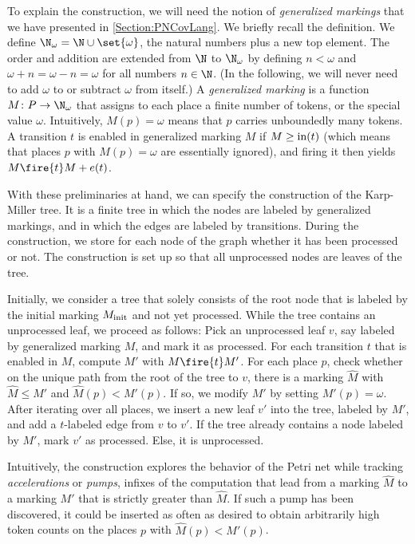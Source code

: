\documentclass[../../diss.tex]{subfiles}
\begin{document}
To explain the construction, we will need the notion of \emph{generalized markings} that we have presented in \cref{Section:PNCovLang}.
We briefly recall the definition.
We define $\N_\omega = \N \cup \set{\omega}$, the natural numbers plus a new top element.
The order and addition are extended from $\N$ to $\N_\omega$ by defining $n < \omega$ and $\omega + n = \omega - n = \omega$ for all numbers $n \in \N$.
(In the following, we will never need to add $\omega$ to or subtract $\omega$ from itself.)
A \emph{generalized marking} is a function $M \colon P \to \N_\omega$ that assigns to each place a finite number of tokens, or the special value $\omega$.
Intuitively, $M(p) = \omega$ means that $p$ carries unboundedly many tokens.
A transition $t$ is enabled in generalized marking $M$ if $M \geq \text{in}(t)$ (which means that places $p$ with $M(p) = \omega$ are essentially ignored), and firing it then yields $M \fire{t} M + e(t)$.

With these preliminaries at hand, we can specify the construction of the Karp-Miller tree.
It is a finite tree in which the nodes are labeled by generalized markings, and in which the edges are labeled by transitions.
During the construction, we store for each node of the graph whether it has been processed or not.
The construction is set up so that all unprocessed nodes are leaves of the tree.

Initially, we consider a tree that solely consists of the root node that is labeled by the initial marking $M_{\text{init}}$ and not yet processed.
While the tree contains an unprocessed leaf, we proceed as follows:
Pick an unprocessed leaf $v$, say labeled by generalized marking $M$, and mark it as processed.
For each transition $t$ that is enabled in $M$, compute $M'$ with $M \fire{t} M'$.
For each place $p$, check whether on the unique path from the root of the tree to $v$, there is a marking $\hat{M}$ with $\hat{M} \leq M'$ and $\hat{M}(p) < M'(p)$.
If so, we modify $M'$ by setting $M'(p) = \omega$.
After iterating over all places, we insert a new leaf $v'$ into the tree, labeled by $M'$, and add a $t$-labeled edge from $v$ to $v'$.
If the tree already contains a node labeled by $M'$, mark $v'$ as processed.
Else, it is unprocessed.

Intuitively, the construction explores the behavior of the Petri net while tracking \emph{accelerations} or \emph{pumps}, \ie infixes of the computation that lead from a marking $\hat{M}$ to a marking $M'$ that is strictly greater than $\hat{M}$.
If such a pump has been discovered, it could be inserted as often as desired to obtain arbitrarily high token counts on the places $p$ with $\hat{M}(p) < M'(p)$.
\end{document}
